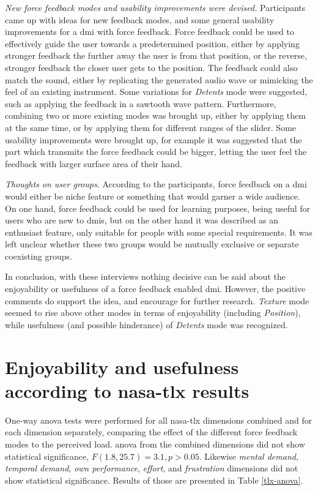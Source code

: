 \textit{New force feedback modes and usability improvements were devised.} Participants came up with ideas for new feedback modes, and some general usability improvements for a \gls{dmi} with force feedback. Force feedback could be used to effectively guide the user towards a predetermined position, either by applying stronger feedback the further away the user is from that position, or the reverse, stronger feedback the closer user gets to the position. The feedback could also match the sound, either by replicating the generated audio wave or mimicking the feel of an existing instrument. Some variations for \textit{Detents} mode were suggested, such as applying the feedback in a sawtooth wave pattern. Furthermore, combining two or more existing modes was brought up, either by applying them at the same time, or by applying them for different ranges of the slider. Some usability improvements were brought up, for example it was suggested that the part which transmits the force feedback could be bigger, letting the user feel the feedback with larger surface area of their hand.

\textit{Thoughts on user groups.} According to the participants, force feedback on a \gls{dmi} would either be niche feature or something that would garner a wide audience. On one hand, force feedback could be used for learning purposes, being useful for users who are new to \glspl{dmi}, but on the other hand it was described as an enthusiast feature, only suitable for people with some special requirements. It was left unclear whether these two groups would be mutually exclusive or separate coexisting groups.

In conclusion, with these interviews nothing decisive can be said about the enjoyability or usefulness of a force feedback enabled \gls{dmi}. However, the positive comments do support the idea, and encourage for further research. \textit{Texture} mode seemed to rise above other modes in terms of enjoyability (including \textit{Position}), while usefulness (and possible hinderance) of \textit{Detents} mode was recognized.

\section{Enjoyability and usefulness according to \gls{nasa-tlx} results}

One-way \gls{anova} tests were performed for all \gls{nasa-tlx} dimensions combined and for each dimension separately, comparing the effect of the different force feedback modes to the perceived load. \gls{anova} from the combined dimensions did not show statistical significance, $F(1.8, 25.7) = 3.1, p > 0.05$. Likewise \textit{mental demand}, \textit{temporal demand}, \textit{own performance}, \textit{effort}, and \textit{frustration} dimensions did not show statistical significance. Results of those are presented in Table \ref{tlx-anova}.

